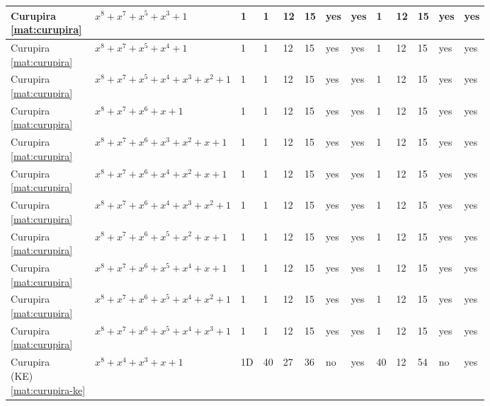 \begin{tiny}
\begin{longtable}{|l|l|l|l|l|l|l|l|l|l|l|l|l|}
\shortstack{Curupira \\ \eqref{mat:curupira}} & $x^8 + x^7 + x^5 + x^3 + 1$ & 1 & 1 & 12 & 15 & yes & yes & 1 & 12 & 15 & yes & yes \\ \hline
\shortstack{Curupira \\ \eqref{mat:curupira}} & $x^8 + x^7 + x^5 + x^4 + 1$ & 1 & 1 & 12 & 15 & yes & yes & 1 & 12 & 15 & yes & yes \\ \hline
\shortstack{Curupira \\ \eqref{mat:curupira}} & $x^8 + x^7 + x^5 + x^4 + x^3 + x^2 + 1$ & 1 & 1 & 12 & 15 & yes & yes & 1 & 12 & 15 & yes & yes \\ \hline
\shortstack{Curupira \\ \eqref{mat:curupira}} & $x^8 + x^7 + x^6 + x + 1$ & 1 & 1 & 12 & 15 & yes & yes & 1 & 12 & 15 & yes & yes \\ \hline
\shortstack{Curupira \\ \eqref{mat:curupira}} & $x^8 + x^7 + x^6 + x^3 + x^2 + x + 1$ & 1 & 1 & 12 & 15 & yes & yes & 1 & 12 & 15 & yes & yes \\ \hline
\shortstack{Curupira \\ \eqref{mat:curupira}} & $x^8 + x^7 + x^6 + x^4 + x^2 + x + 1$ & 1 & 1 & 12 & 15 & yes & yes & 1 & 12 & 15 & yes & yes \\ \hline
\shortstack{Curupira \\ \eqref{mat:curupira}} & $x^8 + x^7 + x^6 + x^4 + x^3 + x^2 + 1$ & 1 & 1 & 12 & 15 & yes & yes & 1 & 12 & 15 & yes & yes \\ \hline
\shortstack{Curupira \\ \eqref{mat:curupira}} & $x^8 + x^7 + x^6 + x^5 + x^2 + x + 1$ & 1 & 1 & 12 & 15 & yes & yes & 1 & 12 & 15 & yes & yes \\ \hline
\shortstack{Curupira \\ \eqref{mat:curupira}} & $x^8 + x^7 + x^6 + x^5 + x^4 + x + 1$ & 1 & 1 & 12 & 15 & yes & yes & 1 & 12 & 15 & yes & yes \\ \hline
\shortstack{Curupira \\ \eqref{mat:curupira}} & $x^8 + x^7 + x^6 + x^5 + x^4 + x^2 + 1$ & 1 & 1 & 12 & 15 & yes & yes & 1 & 12 & 15 & yes & yes \\ \hline
\shortstack{Curupira \\ \eqref{mat:curupira}} & $x^8 + x^7 + x^6 + x^5 + x^4 + x^3 + 1$ & 1 & 1 & 12 & 15 & yes & yes & 1 & 12 & 15 & yes & yes \\ \hline
\shortstack{Curupira \\ (KE) \\ \eqref{mat:curupira-ke}} & $x^8 + x^4 + x^3 + x + 1$ & 1D & 40 & 27 & 36 & no & yes & 40 & 12 & 54 & no & yes \\ \hline

\end{longtable}
\end{tiny}
